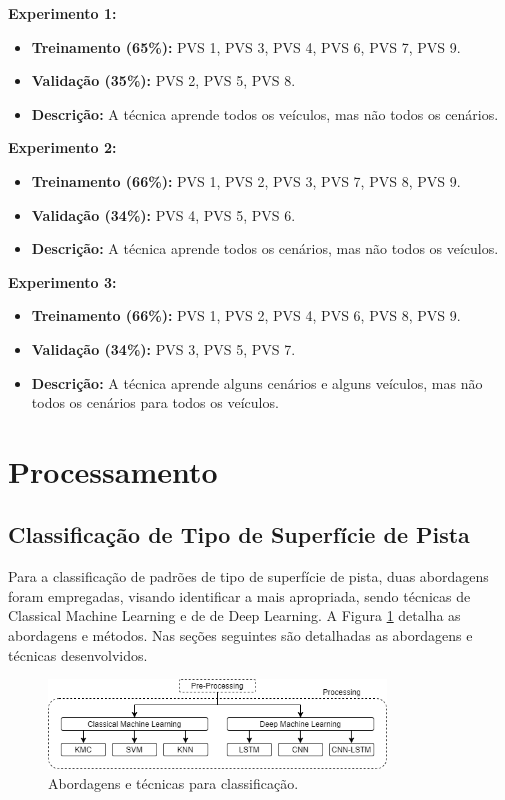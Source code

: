 \textbf{Experimento 1:}
\begin{itemize}
    \item \textbf{Treinamento (65\%):} PVS 1, PVS 3, PVS 4, PVS 6, PVS 7, PVS 9. 
    \item \textbf{Validação (35\%):} PVS 2, PVS 5, PVS 8.
    \item \textbf{Descrição:} A técnica aprende todos os veículos, mas não todos os cenários.\newline
\end{itemize}

\textbf{Experimento 2:}
\begin{itemize}
    \item \textbf{Treinamento (66\%):} PVS 1, PVS 2, PVS 3, PVS 7, PVS 8, PVS 9.
    \item \textbf{Validação (34\%):} PVS 4, PVS 5, PVS 6.
    \item \textbf{Descrição:} A técnica aprende todos os cenários, mas não todos os veículos.\newline
\end{itemize}

\textbf{Experimento 3:}
\begin{itemize}
    \item \textbf{Treinamento (66\%):} PVS 1, PVS 2, PVS 4, PVS 6, PVS 8, PVS 9.
    \item \textbf{Validação (34\%):} PVS 3, PVS 5, PVS 7.
    \item \textbf{Descrição:} A técnica aprende alguns cenários e alguns veículos, mas não todos os cenários para todos os veículos.
\end{itemize}

\section{Processamento}

\subsection{Classificação de Tipo de Superfície de Pista}

Para a classificação de padrões de tipo de superfície de pista, duas abordagens foram empregadas, visando identificar a mais apropriada, sendo técnicas de Classical Machine Learning e de de Deep Learning. A Figura \ref{fig:processing_steps} detalha as abordagens e métodos. Nas seções seguintes são detalhadas as abordagens e técnicas desenvolvidos.

\begin{figure}[h!]
  \centering
  \includegraphics[width=0.8\textwidth]{figuras/processing.png}
  \caption{Abordagens e técnicas para classificação.}
  \label{fig:processing_steps}
\end{figure}

